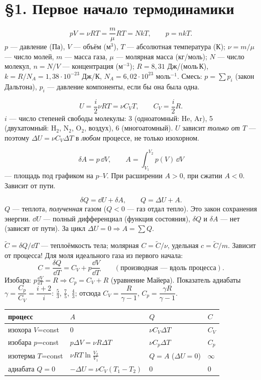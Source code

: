 \section*{§1. Первое начало термодинамики}

\begin{basics}
\[pV=\nu RT=\frac m\mu RT=NkT,\qquad p=nkT.\]
$p$ — давление (Па), $V$ — объём (м$^3$), $T$ — абсолютная температура (К);
$\nu=m/\mu$ — число молей, $m$ — масса газа, $\mu$ — молярная масса (кг/моль);
$N$ — число молекул, $n=N/V$ — концентрация (м$^{-3}$);
$R=8{,}31$ Дж/(моль\,К), $k=R/N_A=1{,}38\cdot10^{-23}$ Дж/К, $N_A=6{,}02\cdot10^{23}$ моль$^{-1}$.
Смесь: $p=\sum p_i$ (закон Дальтона), $p_i$ — давление компоненты, если бы она была одна.

\[U=\frac i2\nu RT=\nu C_VT,\qquad C_V=\frac i2R.\]
$i$ — число степеней свободы молекулы: 3 (одноатомный: He, Ar), 5 (двухатомный: H$_2$, N$_2$, O$_2$, воздух), 6 (многоатомный).
$U$ зависит \emph{только от $T$} — поэтому $\Delta U=\nu C_V\Delta T$ в \emph{любом} процессе, не только изохорном.

\[\delta A=p\,\dd V,\qquad A=\int_{V_1}^{V_2}p(V)\,\dd V\]
— площадь под графиком на $p$--$V$. При расширении $A>0$, при сжатии $A<0$. Зависит от пути.

\[\delta Q=\dd U+\delta A,\qquad Q=\Delta U+A.\]
$Q$ — теплота, \emph{полученная} газом ($Q<0$ — газ отдал тепло). Это закон сохранения энергии.
$\dd U$ — полный дифференциал (функция состояния), $\delta Q$ и $\delta A$ — нет (зависят от пути).
За цикл $\Delta U=0\Rightarrow A=\sum Q$.

$\tilde C=\delta Q/\dd T$ — теплоёмкость тела; молярная $C=\tilde C/\nu$, удельная $c=\tilde C/m$.
Зависит от процесса! Для моля идеального газа из первого начала:
\[C=\frac{\delta Q}{\dd T}=C_V+p\frac{\dd V}{\dd T}\qquad(\text{производная — вдоль процесса}).\]
Изобара: $p\frac{\dd V}{\dd T}=R\Rightarrow C_p=C_V+R$ (уравнение Майера).
Показатель адиабаты $\gamma=\dfrac{C_p}{C_V}=\dfrac{i+2}{i}$: $\frac53$, $\frac75$, $\frac43$; отсюда $C_V=\dfrac{R}{\gamma-1}$, $C_p=\dfrac{\gamma R}{\gamma-1}$.

\begin{tabular}{@{}llll@{}}
процесс & $A$ & $Q$ & $C$\\\hline
изохора $V$=const & $0$ & $\nu C_V\Delta T$ & $C_V$\\
изобара $p$=const & $p\Delta V=\nu R\Delta T$ & $\nu C_p\Delta T$ & $C_p$\\
изотерма $T$=const & $\nu RT\ln\frac{V_2}{V_1}$ & $Q=A$ ($\Delta U=0$) & $\infty$\\
адиабата $Q=0$ & $-\Delta U=\nu C_V(T_1-T_2)$ & $0$ & $0$
\end{tabular}


\end{basics}
